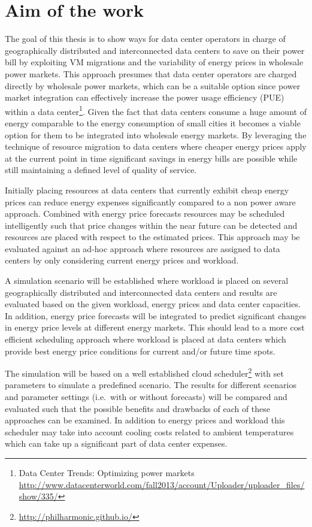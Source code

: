 \section{Aim of the work}

The goal of this thesis is to show ways for data center operators in charge of geographically distributed and interconnected data centers to save on their power bill by exploiting VM migrations and the variability of energy prices in wholesale power markets. This approach presumes that data center operators are charged directly by wholesale power markets, which can be a suitable option since power market integration can effectively increase the power usage efficiency (PUE) within a data center\footnote{Data Center Trends: Optimizing power markets \url{http://www.datacenterworld.com/fall2013/account/Uploader/uploader\_files/show/335/}}. Given the fact that data centers consume a huge amount of energy comparable to the energy consumption of small cities\cite{qureshi2009cutting} it becomes a viable option for them to be integrated into wholesale energy markets. By leveraging the technique of resource migration to data centers where cheaper energy prices apply at the current point in time significant savings in energy bills are possible while still maintaining a defined level of quality of service. 

Initially placing resources at data centers that currently exhibit cheap energy prices can reduce energy expenses significantly compared to a non power aware approach. Combined with energy price forecasts resources may be scheduled intelligently such that price changes within the near future can be detected and resources are placed with respect to the estimated prices. This approach may be evaluated against an ad-hoc approach where resources are assigned to data centers by only considering current energy prices and workload. 

A simulation scenario will be established where workload is placed on several geographically distributed and interconnected data centers and results are evaluated based on the given workload, energy prices and data center capacities. In addition, energy price forecasts will be integrated to predict significant changes in energy price levels at different energy markets. This should lead to a more cost efficient scheduling approach where workload is placed at data centers which provide best energy price conditions for current and/or future time spots. 

The simulation will be based on a well established cloud scheduler\footnote{\url{http://philharmonic.github.io/}} with set parameters to simulate a predefined scenario. The results for different scenarios and parameter settings (i.e.~with or without forecasts) will be compared and evaluated such that the possible benefits and drawbacks of each of these approaches can be examined. 
In addition to energy prices and workload this scheduler may take into account cooling costs related to ambient temperatures which can take up a significant part of data center expenses. 

